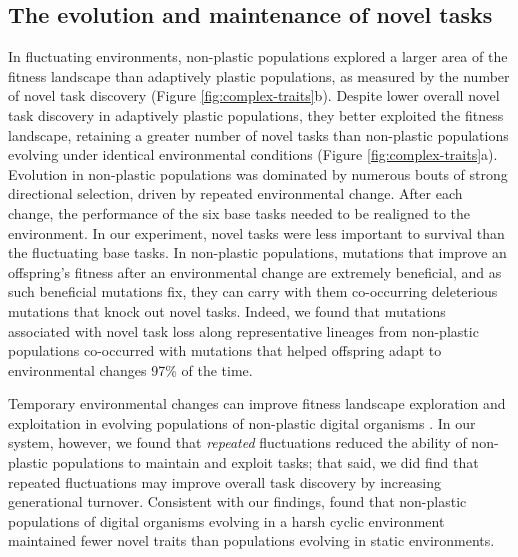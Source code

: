 \subsection{The evolution and maintenance of novel tasks}

In fluctuating environments, non-plastic populations explored a larger area of the fitness landscape than adaptively plastic populations, as measured by the number of novel task discovery (Figure \ref{fig:complex-traits}b).
Despite lower overall novel task discovery in adaptively plastic populations, they better exploited the fitness landscape, retaining a greater number of novel tasks than non-plastic populations evolving under identical environmental conditions (Figure \ref{fig:complex-traits}a).
Evolution in non-plastic populations was dominated by numerous bouts of strong directional selection, driven by repeated environmental change.
After each change, the performance of the six base tasks needed to be realigned to the environment. 
In our experiment, novel tasks were less important to survival than the fluctuating base tasks.
In non-plastic populations, mutations that improve an offspring's fitness after an environmental change are extremely beneficial, and as such beneficial mutations fix, they can carry with them co-occurring deleterious mutations that knock out novel tasks. 
Indeed, we found that mutations associated with novel task loss along representative lineages from non-plastic populations co-occurred with mutations that helped offspring adapt to environmental changes 97\% of the time.

Temporary environmental changes can improve fitness landscape exploration and exploitation in evolving populations of non-plastic digital organisms \citep{nahum_improved_2017}.
In our system, however, we found that \textit{repeated} fluctuations reduced the ability of non-plastic populations to maintain and exploit tasks; that said, we did find that repeated fluctuations may improve overall task discovery by increasing generational turnover. 
Consistent with our findings, \cite{canino-koning_fluctuating_2019} found that non-plastic populations of digital organisms evolving in a harsh cyclic environment maintained fewer novel traits than populations evolving in static environments.

